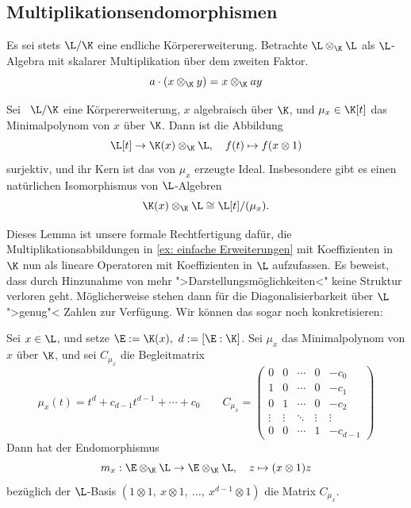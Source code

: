 \documentclass[11pt, a4paper]{article}
\begin{document}
\subsection{Multiplikationsendomorphismen}
Es sei stets $\L/\K$ eine endliche Körpererweiterung. Betrachte $\L\otimes _\K \L$ als $\L$-Algebra mit skalarer Multiplikation über dem zweiten Faktor.
$$a\cdot(x\otimes_\K y)= x\otimes_\K ay$$


\begin{lemma} \Theorem
    Sei \ $\L/\K$ eine Körpererweiterung, $x$ algebraisch über $\K$, und $\mu_x \in \K[t]$ das Minimalpolynom von $x$ über $\K$. Dann ist die Abbildung
    $$\L[t] \to \K(x) \otimes_\K \L, \quad f(t) \mapsto f(x\otimes 1)$$
    surjektiv, und ihr Kern ist das von $\mu_x$ erzeugte Ideal. Insbesondere gibt es einen natürlichen Isomorphismus von $\L$-Algebren
    $$\K(x) \otimes_\K \L \cong \L[t]/(\mu_x).$$
\end{lemma}

\begin{note}
    Dieses Lemma ist unsere formale Rechtfertigung dafür, die Multiplikationsabbildungen in \ref{ex: einfache Erweiterungen} mit Koeffizienten in $\K$ nun als lineare Operatoren mit Koeffizienten in $\L$ aufzufassen. Es beweist, dass durch Hinzunahme von mehr ">Darstellungsmöglichkeiten<" keine Struktur verloren geht. Möglicherweise stehen dann für die Diagonalisierbarkeit über $\L$ ">genug"< Zahlen zur Verfügung. Wir können das sogar noch konkretisieren:
\end{note}

\begin{lemma} \Theorem
    Sei $x \in \L$, und setze
    $\E := \K(x), \ d := [\E:\K]$.
    Sei $\mu_x$ das Minimalpolynom von $x$ über $\K$, und sei $C_{\mu_x}$ die Begleitmatrix
    $$\mu_x(t) = t^d + c_{d-1}t^{d-1} + \cdots + c_0\qquad C_{\mu_x} = \begin{pmatrix}
        0 & 0 & \cdots & 0 & -c_0 \\
        1 & 0 & \cdots & 0 & -c_1 \\
        0 & 1 & \cdots & 0 & -c_2 \\
        \vdots & \vdots & \ddots & \vdots & \vdots \\
        0 & 0 & \cdots & 1 & -c_{d-1}
    \end{pmatrix}  $$
    Dann hat der Endomorphismus
    $$m_x: \E\otimes_\K \L \to \E\otimes_\K \L, \quad z \mapsto (x\otimes 1)z$$
    bezüglich der $\L$-Basis
    $(1\otimes 1,\ x\otimes 1,\ \dots,\ x^{d-1}\otimes 1)$
    die Matrix $C_{\mu_x}$.
\end{lemma}
\end{document}
